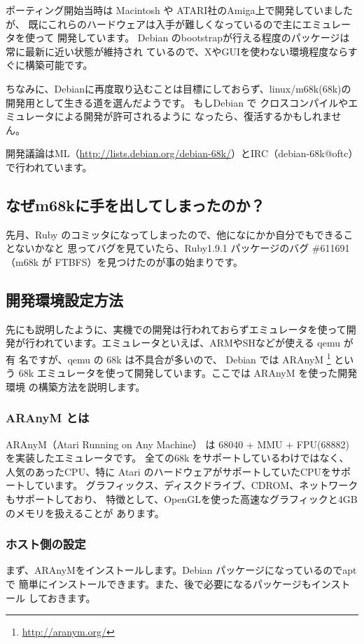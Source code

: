 \documentclass[mingoth,a4paper]{jsarticle}
\begin{document}
ポーティング開始当時は Macintosh や ATARI社のAmiga上で開発していましたが、
既にこれらのハードウェアは入手が難しくなっているので主にエミュレータを使って
開発しています。
Debian のbootstrapが行える程度のパッケージは常に最新に近い状態が維持され
ているので、XやGUIを使わない環境程度ならすぐに構築可能です。

ちなみに、Debianに再度取り込むことは目標にしておらず、linux/m68k(68k)の
開発用として生きる道を選んだようです。
もしDebian で クロスコンパイルやエミュレータによる開発が許可されるように
なったら、復活するかもしれません。

開発議論はML（\url{http://lists.debian.org/debian-68k/}）とIRC（debian-68k@oftc）で行われています。

\subsection{なぜm68kに手を出してしまったのか？}

先月、Ruby のコミッタになってしまったので、他になにかか自分でもできることないかなと
思ってバグを見ていたら、Ruby1.9.1 パッケージのバグ \#611691 （m68k が
FTBFS）を見つけたのが事の始まりです。

\subsection{開発環境設定方法}

先にも説明したように、実機での開発は行われておらずエミュレータを使って開
発が行われています。エミュレータといえば、ARMやSHなどが使える qemu が有
名ですが、qemu の 68k は不具合が多いので、
Debian では ARAnyM \footnote{\url{http://aranym.org/}}
という 68k エミュレータを使って開発しています。ここでは ARAnyM を使った開発環境
の構築方法を説明します。

\subsubsection{ARAnyM とは}

ARAnyM（Atari Running on Any Machine） は 68040 + MMU + FPU(68882) を実装したエミュレータです。
全ての68k をサポートしているわけではなく、人気のあったCPU、特に
Atari のハードウェアがサポートしていたCPUをサポートしています。
グラフィックス、ディスクドライブ、CDROM、ネットワークもサポートしており、
特徴として、OpenGLを使った高速なグラフィックと4GB のメモリを扱えることが
あります。

\subsubsection{ホスト側の設定}
まず、ARAnyMをインストールします。Debian パッケージになっているのでaptで
簡単にインストールできます。また、後で必要になるパッケージもインストール
しておきます。
\end{document}
